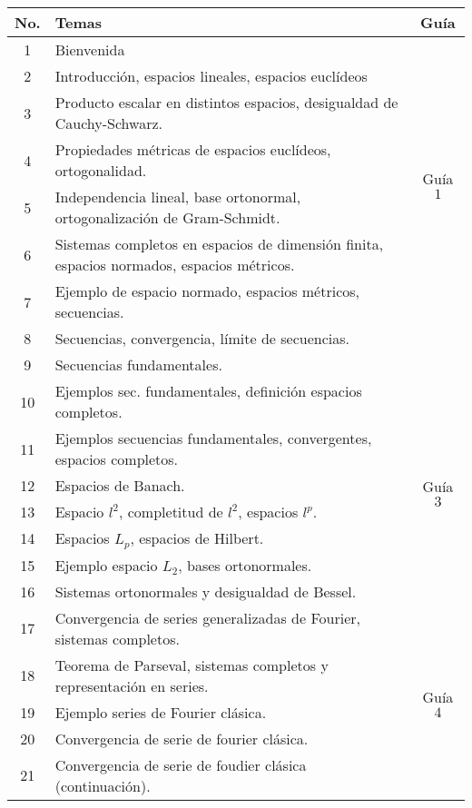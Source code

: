 \vspace{1cm}


\begin{table}[H]
	\centering
	\begin{tabular}{||c|p{13cm}||c||}
		\hline
		\hline
			No. & Temas & Guía \\
		\hline
		\hline
			1  & Bienvenida &  \\
		\hline
			2  & Introducción, espacios lineales, espacios euclídeos &  \\
			3  & Producto escalar en distintos espacios, desigualdad de Cauchy-Schwarz. & \multirow{4}{2cm}{Guía $1$} \\
			4  & Propiedades métricas de espacios euclídeos, ortogonalidad.  &  \\
			5  & Independencia lineal, base ortonormal,  ortogonalización de Gram-Schmidt. &  \\
		\hline
			6  & Sistemas completos en espacios de dimensión finita, espacios normados, espacios métricos. & \multirow{4}{2cm}{Guía $2$} \\
			7  & Ejemplo de espacio normado, espacios métricos, secuencias. &  \\
			8  & Secuencias, convergencia, límite de secuencias. &  \\
			9  & Secuencias fundamentales. &  \\
		\hline
			10 & Ejemplos sec. fundamentales, definición espacios completos. & \multirow{7}{2cm}{Guía $3$} \\
			11 & Ejemplos secuencias fundamentales, convergentes, espacios completos. &  \\
			12 & Espacios de Banach. &  \\
			13 & Espacio $l^2$, completitud de $l^2$, espacios $l^p$. &  \\
			14 & Espacios $L_p$, espacios de Hilbert. &  \\
			15 & Ejemplo espacio $L_2$, bases ortonormales. &  \\
			16 & Sistemas ortonormales y desigualdad de Bessel. &  \\
		\hline
			17 & Convergencia de series generalizadas de Fourier, sistemas completos. & \multirow{5}{2cm}{Guía $4$} \\
			18 & Teorema de Parseval, sistemas completos y representación en series. & \\
			19 & Ejemplo series de Fourier clásica. & \\
			20 & Convergencia de serie de fourier clásica. & \\
			21 & Convergencia de serie de foudier clásica (continuación). & \\

\end{tabular}
\end{table}
